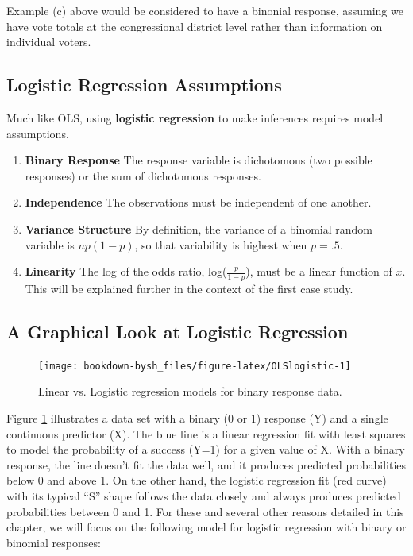 \documentclass[
]{krantz}
\providecommand{\tightlist}{%
  \setlength{\itemsep}{0pt}\setlength{\parskip}{0pt}}
\begin{document}
Example (c) above would be considered to have a binonial response, assuming we have vote totals at the congressional district level rather than information on individual voters.

\hypertarget{logistic-regression-assumptions}{%
\subsection{Logistic Regression Assumptions}\label{logistic-regression-assumptions}}

Much like OLS, using \textbf{logistic regression}  to make inferences requires model assumptions.

\begin{enumerate}
\def\labelenumi{\arabic{enumi}.}
\tightlist
\item
  \textbf{Binary Response} The response variable is dichotomous (two possible responses) or the sum of dichotomous responses.
\item
  \textbf{Independence} The observations must be independent of one another.
\item
  \textbf{Variance Structure} By definition, the variance of a binomial random variable is \(np(1-p)\), so that variability is highest when \(p=.5\).
\item
  \textbf{Linearity} The log of the odds ratio, log(\(\frac{p}{1-p}\)), must be a linear function of \(x\). This will be explained further in the context of the first case study.
\end{enumerate}

\hypertarget{a-graphical-look-at-logistic-regression}{%
\subsection{A Graphical Look at Logistic Regression}\label{a-graphical-look-at-logistic-regression}}

\begin{figure}

{\centering \texttt{[image: bookdown-bysh\_files/figure-latex/OLSlogistic-1]} 

}

\caption{Linear vs. Logistic regression models for binary response data.}\label{fig:OLSlogistic}
\end{figure}

Figure \ref{fig:OLSlogistic} illustrates a data set with a binary (0 or 1) response (Y) and a single continuous predictor (X). The blue line is a linear regression fit with least squares to model the probability of a success (Y=1) for a given value of X. With a binary response, the line doesn't fit the data well, and it produces predicted probabilities below 0 and above 1. On the other hand, the logistic regression fit (red curve) with its typical ``S'' shape follows the data closely and always produces predicted probabilities between 0 and 1. For these and several other reasons detailed in this chapter, we will focus on the following model for logistic regression with binary or binomial responses:
\end{document}
